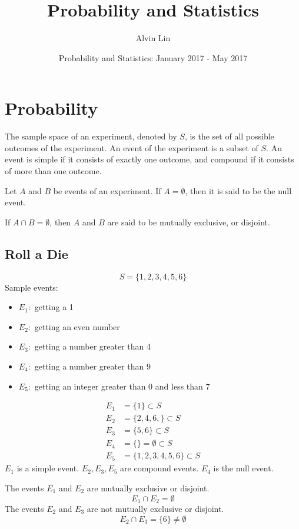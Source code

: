 \documentclass[letterpaper, 12pt]{math}
\title{Probability and Statistics}
\author{Alvin Lin}
\date{Probability and Statistics: January 2017 - May 2017}
\begin{document}
\maketitle

\section*{Probability}
The sample space of an experiment, denoted by \( S \), is the set of all
possible outcomes of the experiment. An event of the experiment is a subset
of \( S \). An event is simple if it consists of exactly one outcome, and
compound if it consists of more than one outcome. \par
Let \( A \) and \( B \) be events of an experiment. If \( A = \emptyset \),
then it is said to be the null event. \par
If \( A \cap B = \emptyset \), then \( A \) and \( B \) are said to be mutually
exclusive, or disjoint.

\subsection*{Roll a Die}
\[ S = \big\{ 1, 2, 3, 4, 5, 6 \big\} \]
Sample events:
\begin{itemize}
  \item \( E_{1}: \) getting a 1
  \item \( E_{2}: \) getting an even number
  \item \( E_{3}: \) getting a number greater than 4
  \item \( E_{4}: \) getting a number greater than 9
  \item \( E_{5}: \) getting an integer greater than 0 and less than 7
\end{itemize}
\begin{align*}
  E_{1} &= \big\{ 1 \big\} \subset S \\
  E_{2} &= \big\{ 2, 4, 6, \big\} \subset S \\
  E_{3} &= \big\{ 5, 6 \big\} \subset S \\
  E_{4} &= \big\{ \big\} = \emptyset \subset S \\
  E_{5} &= \big\{ 1, 2, 3, 4, 5, 6 \big\} \subset S
\end{align*}
\( E_{1} \) is a simple event. \( E_{2}, E_{3}, E_{5} \) are compound events.
\( E_{4} \) is the null event. \par
The events \( E_{1} \) and \( E_{2} \) are mutually exclusive or disjoint.
\[ E_{1} \cap E_{2} = \emptyset \]
The events \( E_{2} \) and \( E_{3} \) are not mutually exclusive or disjoint.
\[ E_{2} \cap E_{3} = \big\{ 6 \big\} \neq \emptyset \]
\end{document}
